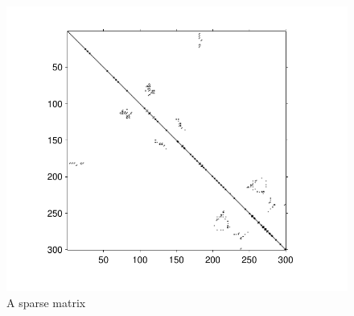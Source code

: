 \documentclass[twoside]{article}
\begin{document}
\begin{multicols}{2}
\begin{figure}[H]
\centering
\includegraphics[width=\columnwidth]{fig/h_matrix.pdf}
\caption{A sparse matrix}
\label{fig:h_matrix}
\end{figure}


\end{multicols}
\end{document}
